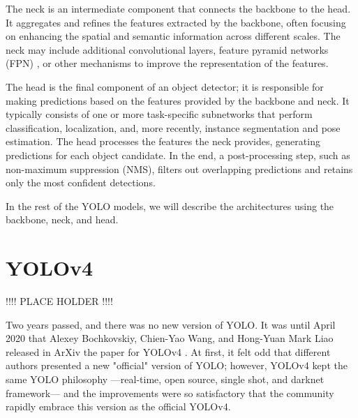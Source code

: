 \documentclass{article}
\begin{document}
The neck is an intermediate component that connects the backbone to the head. It aggregates and refines the features extracted by the backbone, often focusing on enhancing the spatial and semantic information across different scales. The neck may include additional convolutional layers, feature pyramid networks (FPN) \cite{lin2017feature}, or other mechanisms to improve the representation of the features.

The head is the final component of an object detector; it is responsible for making predictions based on the features provided by the backbone and neck. It typically consists of one or more task-specific subnetworks that perform classification, localization, and, more recently, instance segmentation and pose estimation. The head processes the features the neck provides, generating predictions for each object candidate. In the end, a post-processing step, such as non-maximum suppression (NMS), filters out overlapping predictions and retains only the most confident detections.

In the rest of the YOLO models, we will describe the architectures using the backbone, neck, and head.



\section{YOLOv4}

!!!! PLACE HOLDER !!!!

Two years passed, and there was no new version of YOLO. It was until April 2020 that Alexey Bochkovskiy, Chien-Yao Wang, and Hong-Yuan Mark Liao released in ArXiv the paper for YOLOv4 \cite{bochkovskiy2020yolov4}. At first, it felt odd that different authors presented a new "official" version of YOLO; however, YOLOv4 kept the same YOLO philosophy —real-time, open source, single shot, and darknet framework— and the improvements were so satisfactory that the community rapidly embrace this version as the official YOLOv4.
\end{document}
